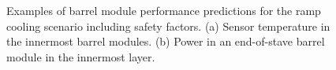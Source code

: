 \begin{figure}[ht]
\centering
{}\quad\quad
{}
\caption{Examples of barrel module performance predictions for the ramp cooling scenario including safety factors. (a) Sensor temperature in the innermost barrel modules. (b) Power in an end-of-stave barrel module in the innermost layer.}
\label{fig:modulerampperformance}
\end{figure}

